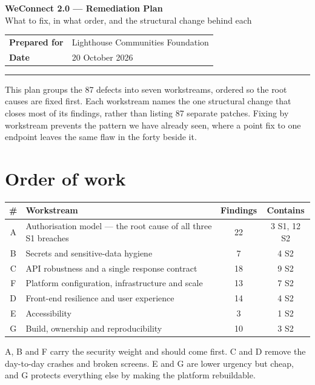\documentclass[11pt]{article}
\begin{document}
\justifying

\begin{center}
{\LARGE\bfseries WeConnect 2.0 --- Remediation Plan}\\[4pt]
{\large What to fix, in what order, and the structural change behind each}\\[10pt]
\end{center}

\begin{tabular}{@{}ll@{}}
\textbf{Prepared for} & Lighthouse Communities Foundation \\
\textbf{Date} & 20 October 2026 \\
\end{tabular}

\vspace{3pt}\hrule\vspace{2pt}

This plan groups the 87 defects into seven workstreams, ordered so the root causes are fixed first.
Each workstream names the one structural change that closes most of its findings, rather than listing
87 separate patches. Fixing by workstream prevents the pattern we have already seen, where a point
fix to one endpoint leaves the same flaw in the forty beside it.

\section{Order of work}
\begin{tabularx}{\textwidth}{@{}c>{\RaggedRight\arraybackslash}X c c@{}}
\toprule
\textbf{\#} & \textbf{Workstream} & \textbf{Findings} & \textbf{Contains} \\
\midrule
A & Authorisation model --- the root cause of all three S1 breaches & 22 & 3 S1, 12 S2 \\
B & Secrets and sensitive-data hygiene & 7 & 4 S2 \\
C & API robustness and a single response contract & 18 & 9 S2 \\
F & Platform configuration, infrastructure and scale & 13 & 7 S2 \\
D & Front-end resilience and user experience & 14 & 4 S2 \\
E & Accessibility & 3 & 1 S2 \\
G & Build, ownership and reproducibility & 10 & 3 S2 \\
\bottomrule
\end{tabularx}

A, B and F carry the security weight and should come first. C and D remove the day-to-day crashes and
broken screens. E and G are lower urgency but cheap, and G protects everything else by making the
platform rebuildable.
\end{document}
